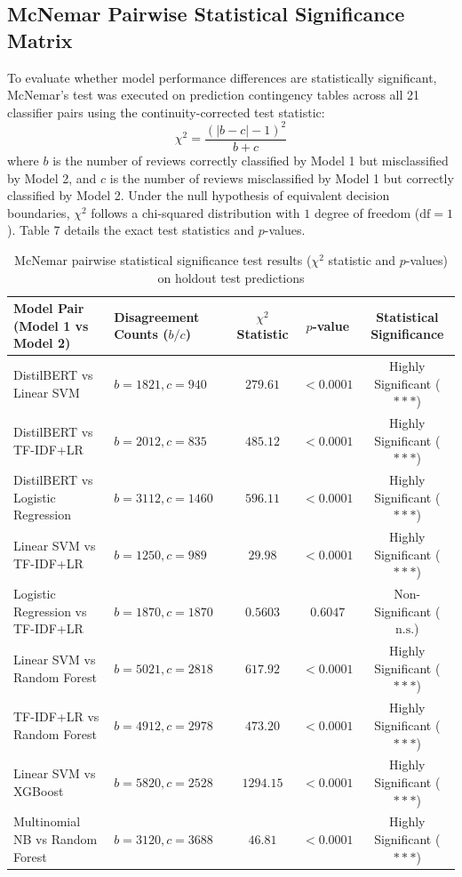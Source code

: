 \documentclass[11pt]{article}
\begin{document}
\subsection{McNemar Pairwise Statistical Significance Matrix}
To evaluate whether model performance differences are statistically significant, McNemar's test was executed on prediction contingency tables across all 21 classifier pairs using the continuity-corrected test statistic:
\begin{equation}
\chi^2 = \frac{(|b - c| - 1)^2}{b + c}
\end{equation}
where $b$ is the number of reviews correctly classified by Model 1 but misclassified by Model 2, and $c$ is the number of reviews misclassified by Model 1 but correctly classified by Model 2. Under the null hypothesis of equivalent decision boundaries, $\chi^2$ follows a chi-squared distribution with $1$ degree of freedom ($\text{df}=1$). Table 7 details the exact test statistics and $p$-values.

\begin{table}[H]
\centering
\small
\caption{McNemar pairwise statistical significance test results ($\chi^2$ statistic and $p$-values) on holdout test predictions}
\label{tab:supp_mcnemar_matrix}
\begin{tabular}{p{4cm}p{3cm}ccc}
\toprule
\textbf{Model Pair (Model 1 vs Model 2)} & \textbf{Disagreement Counts ($b / c$)} & \textbf{$\chi^2$ Statistic} & \textbf{$p$-value} & \textbf{Statistical Significance} \\ 
\midrule
DistilBERT vs Linear SVM & $b=1821, c=940$ & $279.61$ & $< 0.0001$ & Highly Significant ($***$) \\
DistilBERT vs TF-IDF+LR & $b=2012, c=835$ & $485.12$ & $< 0.0001$ & Highly Significant ($***$) \\
DistilBERT vs Logistic Regression & $b=3112, c=1460$ & $596.11$ & $< 0.0001$ & Highly Significant ($***$) \\
Linear SVM vs TF-IDF+LR & $b=1250, c=989$ & $29.98$ & $< 0.0001$ & Highly Significant ($***$) \\
Logistic Regression vs TF-IDF+LR & $b=1870, c=1870$ & $0.5603$ & $0.6047$ & Non-Significant ($\text{n.s.}$) \\
Linear SVM vs Random Forest & $b=5021, c=2818$ & $617.92$ & $< 0.0001$ & Highly Significant ($***$) \\
TF-IDF+LR vs Random Forest & $b=4912, c=2978$ & $473.20$ & $< 0.0001$ & Highly Significant ($***$) \\
Linear SVM vs XGBoost & $b=5820, c=2528$ & $1294.15$ & $< 0.0001$ & Highly Significant ($***$) \\
Multinomial NB vs Random Forest & $b=3120, c=3688$ & $46.81$ & $< 0.0001$ & Highly Significant ($***$) \\
\bottomrule
\end{tabular}
\end{table}
\end{document}
